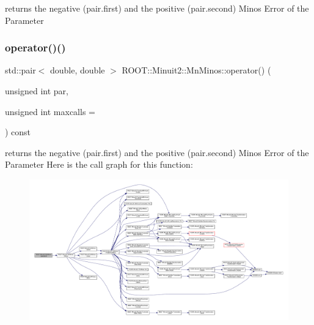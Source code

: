 returns the negative (pair.\+first) and the positive (pair.\+second) Minos Error of the Parameter \mbox{\label{classROOT_1_1Minuit2_1_1MnMinos_aa3605120b9628fe22416f723f25383b0}} 
\subsubsection{\texorpdfstring{operator()()}{operator()()}\hspace{0.1cm}{\footnotesize\ttfamily [2/3]}}
{\footnotesize\ttfamily std\+::pair$<$ double, double $>$ R\+O\+O\+T\+::\+Minuit2\+::\+Mn\+Minos\+::operator() (\begin{DoxyParamCaption}\item[{unsigned int}]{par,  }\item[{unsigned int}]{maxcalls = {} }\end{DoxyParamCaption}) const}

returns the negative (pair.\+first) and the positive (pair.\+second) Minos Error of the Parameter Here is the call graph for this function\+:
\nopagebreak
\begin{figure}[H]
\begin{center}
\leavevmode
\includegraphics[width=350pt]{dc/d91/classROOT_1_1Minuit2_1_1MnMinos_aa3605120b9628fe22416f723f25383b0_cgraph}
\end{center}
\end{figure}
\mbox{\label{classROOT_1_1Minuit2_1_1MnMinos_a82c85ed2e8212675339ffcc2a5bb61cb}} 
